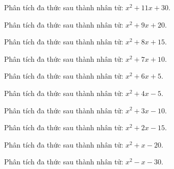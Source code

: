\begin{bt}
	Phân tích đa thức sau thành nhân tử: $x^2 + 11 x + 30$.
\end{bt}
\begin{bt}
	Phân tích đa thức sau thành nhân tử: $x^2 + 9 x + 20$.
\end{bt}
\begin{bt}
	Phân tích đa thức sau thành nhân tử: $x^2 + 8 x + 15$.
\end{bt}
\begin{bt}
	Phân tích đa thức sau thành nhân tử: $x^2 + 7 x + 10$.
\end{bt}
\begin{bt}
	Phân tích đa thức sau thành nhân tử: $x^2 + 6 x + 5$.
\end{bt}
\begin{bt}
	Phân tích đa thức sau thành nhân tử: $x^2 + 4 x - 5$.
\end{bt}
\begin{bt}
	Phân tích đa thức sau thành nhân tử: $x^2 + 3 x - 10$.
\end{bt}
\begin{bt}
	Phân tích đa thức sau thành nhân tử: $x^2 + 2 x - 15$.
\end{bt}
\begin{bt}
	Phân tích đa thức sau thành nhân tử: $x^2 + x - 20$.
\end{bt}
\begin{bt}
	Phân tích đa thức sau thành nhân tử: $x^2 - x - 30$.
\end{bt}
